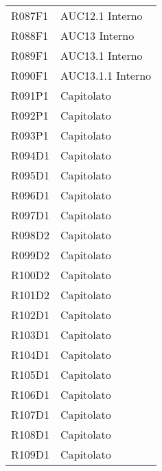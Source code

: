 \documentclass[../analisi-dei-requisiti.tex]{subfiles}
\begin{document}
\begin{longtable}[H]{>{\centering}m{5cm} >{\centering}m{5cm}}
  R087F1                               & AUC12.1 Interno               \\
  R088F1                               & AUC13 Interno                 \\
  R089F1                               & AUC13.1 Interno               \\
  R090F1                               & AUC13.1.1 Interno             \\
  R091P1                               & Capitolato                    \\
  R092P1                               & Capitolato                    \\
  R093P1                               & Capitolato                    \\
  R094D1                               & Capitolato                    \\
  R095D1                               & Capitolato                    \\
  R096D1                               & Capitolato                    \\
  R097D1                               & Capitolato                    \\
  R098D2                               & Capitolato                    \\
  R099D2                               & Capitolato                    \\
  R100D2                               & Capitolato                    \\
  R101D2                               & Capitolato                    \\
  R102D1                               & Capitolato                    \\
  R103D1                               & Capitolato                    \\
  R104D1                               & Capitolato                    \\
  R105D1                               & Capitolato                    \\
  R106D1                               & Capitolato                    \\
  R107D1                               & Capitolato                    \\
  R108D1                               & Capitolato                    \\
  R109D1                               & Capitolato                    \\

\end{longtable}
\end{document}
